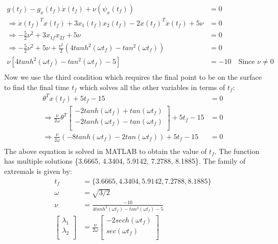 \begin{enumerate}
\begin{enumerate}
    \begin{align*}
   g(t_f) - g_{\dot x}(t_f) \dot x(t_f) + \nu (\psi_x(t_f)) &= 0 \\
   \Rightarrow \dot{x}(t_f)^{T} \dot{x}(t_f)+ 3 x_{1}(t_f) x_{2}(t_f) - 2 \dot{x}(t_f)^{T} \dot{x}(t_f) + 5\nu &= 0\\
   \Rightarrow -\frac{5}{2}\nu^2 + 3 x_{1f} x_{2f} + 5\nu &= 0\\
   \Rightarrow -\frac{5}{2}\nu^2 + 5\nu + \frac{ \nu^2}{2} (4 tanh^2(\omega t_f) - tan^2(\omega t_f)) &= 0\\
   \nu \left[ 4 tanh^2(\omega t_f) - tan^2(\omega t_f) -5 \right] &= -10\quad \text{Since } \nu \neq 0 \\
   \end{align*}
   Now we use the third condition which requires the final point to be on the surface to find the final time $t_f$ which solves all the other variables in terms of $t_f$:
   \begin{align*}
    \theta^{T} x(t_f) + 5t_f - 15 &= 0\\
    \Rightarrow \frac{\nu}{2 \omega} \theta^{T} 
    \begin{bmatrix}
    -2tanh(\omega t_f) + tan(\omega t_f)\\
    -2tanh(\omega t_f) - tan(\omega t_f)\\
  \end{bmatrix} + 5t_f - 15 &= 0\\ 
  \Rightarrow \frac{\nu}{2 \omega} (-8 tanh(\omega t_f) -2 tan(\omega t_f) ) + 5t_f - 15 &= 0\\
\end{align*}
The above equation is solved in MATLAB to obtain the value of $t_f$. The function has multiple solutions \{3.6665, 4.3404, 5.9142, 7.2788, 8.1885\}. The family of extremals is given by:
\begin{align*}
 t_f &= \{3.6665, 4.3404, 5.9142, 7.2788, 8.1885\}\\
 \omega &= \sqrt{3/2}\\
 \nu &= \frac{-10}{4 tanh^2(\omega t_f) - tan^2(\omega t_f) -5 }\\
 \begin{bmatrix}
  \lambda_1 \\
  \lambda_2 \\
 \end{bmatrix} &= \frac{\nu}{2 \omega}
  \begin{bmatrix}
    -2 sech(\omega t_f)\\
    sec(\omega t_f) \\

\end{bmatrix}
\end{align*}
\end{enumerate}
\end{enumerate}
